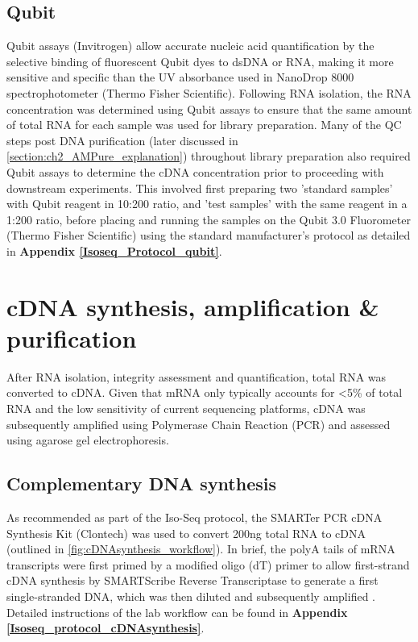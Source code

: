 \subsection{Qubit}
\label{section:ch2_qubit}   
Qubit assays (Invitrogen) allow accurate nucleic acid quantification by the selective binding of fluorescent Qubit dyes to dsDNA or RNA, making it more sensitive and specific than the UV absorbance used in NanoDrop 8000 spectrophotometer (Thermo Fisher Scientific). Following RNA isolation, the RNA concentration was determined using Qubit assays to ensure that the same amount of total RNA for each sample was used for library preparation. Many of the QC steps post DNA purification (later discussed in \cref{section:ch2_AMPure_explanation}) throughout library preparation also required Qubit assays to determine the cDNA concentration prior to proceeding with downstream experiments. This involved first preparing two 'standard samples' with Qubit reagent in 10:200 ratio, and 'test samples' with the same reagent in a 1:200 ratio, before placing and running the samples on the Qubit 3.0 Fluorometer (Thermo Fisher Scientific) using the standard manufacturer's protocol as detailed in \textbf{Appendix  \ref{Isoseq_Protocol_qubit}}.       

\section{cDNA synthesis, amplification \& purification}
After RNA isolation, integrity assessment and quantification, total RNA was converted to cDNA. Given that mRNA only typically accounts for <5\% of total RNA and the low sensitivity of current sequencing platforms, cDNA was subsequently amplified using Polymerase Chain Reaction (PCR) and assessed using agarose gel electrophoresis. 


\subsection{Complementary DNA synthesis}
\label{section:ch2_cDNA_synthesis_explanation} 
As recommended as part of the Iso-Seq protocol, the SMARTer PCR cDNA Synthesis Kit (Clontech) was used to convert 200ng total RNA to cDNA (outlined in \cref{fig:cDNAsynthesis_workflow}). In brief, the polyA tails of mRNA transcripts were first primed by a modified oligo (dT) primer to allow first-strand cDNA synthesis by SMARTScribe Reverse Transcriptase to generate a first single-stranded DNA, which was then diluted and subsequently amplified \cite{Ramskold2012}. Detailed instructions of the lab workflow can be found in \textbf{Appendix \ref{Isoseq_protocol_cDNAsynthesis}}. 

